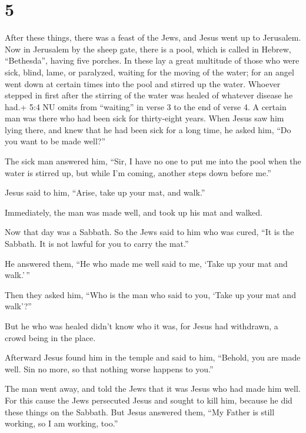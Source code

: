 \hypertarget{section-4}{%
\section{5}\label{section-4}}

 After these things, there was a feast of the Jews, and
Jesus went up to Jerusalem.  Now in Jerusalem by the sheep
gate, there is a pool, which is called in Hebrew, ``Bethesda'', having
five porches.  In these lay a great multitude of those who
were sick, blind, lame, or paralyzed, waiting for the moving of the
water;  for an angel went down at certain times into the
pool and stirred up the water. Whoever stepped in first after the
stirring of the water was healed of whatever disease he had.+ 5:4 NU
omits from ``waiting'' in verse 3 to the end of verse 4.  A
certain man was there who had been sick for thirty-eight years.
 When Jesus saw him lying there, and knew that he had been
sick for a long time, he asked him, ``Do you want to be made well?''

 The sick man answered him, ``Sir, I have no one to put me
into the pool when the water is stirred up, but while I'm coming,
another steps down before me.''

 Jesus said to him, ``Arise, take up your mat, and walk.''

 Immediately, the man was made well, and took up his mat and
walked.

Now that day was a Sabbath.  So the Jews said to him who
was cured, ``It is the Sabbath. It is not lawful for you to carry the
mat.''

 He answered them, ``He who made me well said to me, `Take
up your mat and walk.'\,''

 Then they asked him, ``Who is the man who said to you,
`Take up your mat and walk'?''

 But he who was healed didn't know who it was, for Jesus
had withdrawn, a crowd being in the place.

 Afterward Jesus found him in the temple and said to him,
``Behold, you are made well. Sin no more, so that nothing worse happens
to you.''

 The man went away, and told the Jews that it was Jesus who
had made him well.  For this cause the Jews persecuted
Jesus and sought to kill him, because he did these things on the
Sabbath.  But Jesus answered them, ``My Father is still
working, so I am working, too.''

